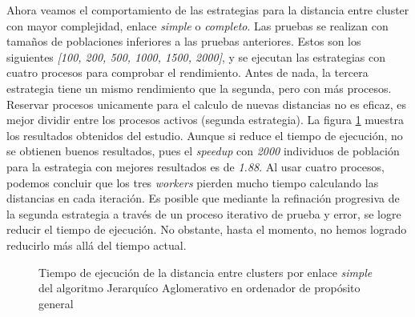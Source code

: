 		Ahora veamos el comportamiento de las estrategias para la distancia entre cluster con mayor complejidad, enlace \textit{simple} o \textit{completo}. Las pruebas se realizan con tamaños de poblaciones inferiores a las pruebas anteriores. Estos son los siguientes \textit{[100, 200, 500, 1000, 1500, 2000]}, y se ejecutan las estrategias con cuatro procesos para comprobar el rendimiento. Antes de nada, la tercera estrategia tiene un mismo rendimiento que la segunda, pero con más procesos. Reservar procesos unicamente para el calculo de nuevas distancias no es eficaz, es mejor dividir entre los procesos activos (segunda estrategia). La figura \ref{fig:JA_simple} muestra los resultados obtenidos del estudio. Aunque si reduce el tiempo de ejecución, no se obtienen buenos resultados, pues el \textit{speedup} con \textit{2000} individuos de población para la estrategia con mejores resultados es de \textit{1.88}. Al usar cuatro procesos, podemos concluir que los tres \textit{workers} pierden mucho tiempo calculando las distancias en cada iteración. Es posible que mediante la refinación progresiva de la segunda estrategia a través de un proceso iterativo de prueba y error, se logre reducir el tiempo de ejecución. No obstante, hasta el momento, no hemos logrado reducirlo más allá del tiempo actual.
		
			\begin{figure}[!h]
				\centering
				\caption{Tiempo de ejecución de la distancia entre clusters por enlace \textit{simple} del algoritmo Jerarquíco Aglomerativo en ordenador de propósito general}
				\label{fig:JA_simple}
			\end{figure}
				
